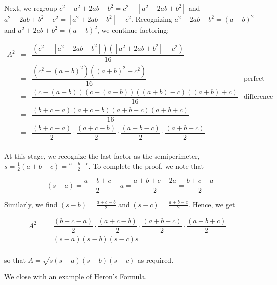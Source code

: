 Next, we regroup $c^2 - a^2 + 2ab - b^2 = c^2 - \left[a^2 - 2ab + b^2\right]$ and  $a^2 + 2ab + b^2- c^2 = \left[a^2 + 2ab + b^2\right]- c^2$.  Recognizing $a^2 - 2ab + b^2 = (a-b)^2$ and $a^2 + 2ab + b^2 = (a+b)^2$, we continue factoring:
	 	
\[ \begin{array}{rclr}

A^2	& = & \dfrac{\left(c^2 - \left[a^2 - 2ab + b^2\right] \right)  \left( \left[a^2 + 2ab + b^2\right]- c^2\right)}{16}  &  \\ [10pt]

	 	& = & \dfrac{\left(c^2 - (a-b)^2 \right)  \left( (a+b)^2- c^2\right)}{16}  &  \text{perfect square trinomials.}\\ [10pt]
	 	
	 	& = & \dfrac{ (c-(a-b))(c+(a-b))((a+b) -c)((a+b)+c)}{16}  &  \text{difference of squares.} \\ [10pt]
	 			 
	 	& = & \dfrac{ (b+c-a)(a+c-b)(a+b-c)(a+b+c)}{16}  &  \\ [10pt]	 	
	 	
	  & = & \dfrac{(b+c-a)}{2} \cdot \dfrac{(a+c-b)}{2} \cdot \dfrac{(a+b-c)}{2} \cdot \dfrac{(a+b+c)}{2}  &  \\ [10pt]	 
	 		
\end{array} \]

At this stage, we recognize the last factor as the semiperimeter, $s = \frac{1}{2}(a+b+c) = \frac{a+b+c}{2}$.  To complete the proof, we note that

\[ (s - a) = \dfrac{a+b+c}{2} - a = \dfrac{a+b+c-2a}{2} = \dfrac{b+c-a}{2} \]  
			
Similarly, we find $(s-b) = \frac{a+c-b}{2}$ and $(s-c) = \frac{a+b-c}{2}$.  Hence, we get

\[ \begin{array}{rclr}

A^2 & = & \dfrac{(b+c-a)}{2} \cdot \dfrac{(a+c-b)}{2} \cdot \dfrac{(a+b-c)}{2} \cdot \dfrac{(a+b+c)}{2}  &  \\ [10pt]	 
	 	
	 	& = & (s-a) (s-b) (s-c) s  &  \\ [10pt]	 	
	 	
\end{array} \]

so that  $A = \sqrt{s(s-a)(s-b)(s-c)}$ as required. 

\smallskip

We close with an example of Heron's Formula.

